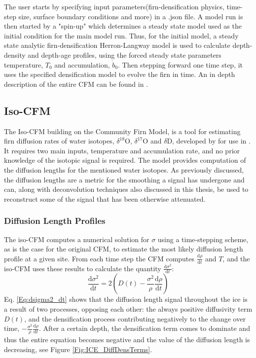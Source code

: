 \documentclass[../../CompleteThesis2/Complete_2ndDraft]{subfiles}
\begin{document}
The user starts by specifying input parameters(firn-densification physics, time-step size, surface boundary conditions and more) in a .json file. A model run is then started by a "spin-up" which determines a steady state model used as the initial condition for the main model run. Thus, for the initial model, a steady state analytic firn-densification Herron-Langway model \cite[Herron and Langway, 1980]{HerronLangway1980} is used to calculate depth-density and depth-age profiles, using the forced steady state parameters temperature, $T_0$ and accumulation, $\dot{b}_0$. Then stepping forward one time step, it uses the specified densification model to evolve the firn in time. An in depth description of the entire CFM can be found in \cite[Stevens et al.]{Stevens2020}.

\subsection[Iso-CFM]{Iso-CFM}
\label{Subsec:Ice_DiffusionAndDensification_IsoCFM}

The Iso-CFM building on the Community Firn Model, is a tool for estimating firn diffusion rates of water isotopes, $\delta^{18}$O, $\delta^{17}$O and $\delta$D, developed by \cite[Gkinis et al., 2021]{Gkinis_2021} for use in \cite{Gkinis_2021}. It requires two main inputs, temperature and accumulation rate, and no prior knowledge of the isotopic signal is required. The model provides computation of the diffusion lengths for the mentioned water isotopes. As previously discussed, the diffusion lengths are a metric for the smoothing a signal has undergone and can, along with deconvolution techniques also discussed in this thesis, be used to reconstruct some of the signal that has been otherwise attenuated.


\subsubsection[Diffusion Length Profiles]{Diffusion Length Profiles}
\label{Subsubsec:Ice_DiffusionAndDensification_IsoCFM_DiffLenProfile}

The iso-CFM computes a numerical solution for $\sigma$ using a time-stepping scheme, as is the case for the original CFM, to estimate the most likely diffusion length profile at a given site. From each time step the CFM computes $\frac{\text{d}\rho}{\text{d}t}$ and $T$, and the iso-CFM uses these results to calculate the quantity $\frac{\text{d}\sigma^2}{\text{d}t}$:
\begin{equation}
	\frac{\text{d}\sigma^2}{\text{d}t} = 2\left(D(t) - \frac{\sigma^2}{\rho}\frac{\text{d}\rho}{\text{d}t}\right)
	\label{Eq:dsigma2_dt}
\end{equation}
Eq. \ref{Eq:dsigma2_dt} shows that the diffusion length signal throughout the ice is a result of two processes, opposing each other: the always positive diffusivity term $D(t)$, and the densification process contributing negatively to the change over time, $-\frac{\sigma^2}{\rho}\frac{\text{d}\rho}{\text{d}t}$. After a certain depth, the densification term comes to dominate and thus the entire equation becomes negative and the value of the diffusion length is decreasing, see Figure \ref{Fig:ICE_DiffDensTerms}.
\end{document}
